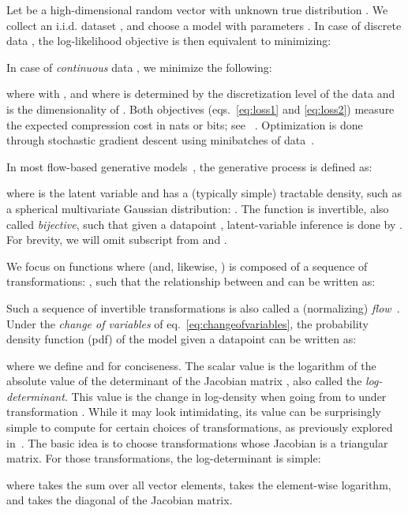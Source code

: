 \documentclass{article}
\begin{document}
Let  be a high-dimensional random vector with unknown true distribution .
We collect an i.i.d. dataset , and choose a model  with parameters . In case of discrete data , the log-likelihood objective is then equivalent to minimizing:

In case of \emph{continuous} data , we minimize the following:

where  with , and  where  is determined by the discretization level of the data and  is the dimensionality of . Both objectives (eqs.~\eqref{eq:loss1} and \eqref{eq:loss2}) measure the expected compression cost in nats or bits; see ~\citep{dinh2016density}. Optimization is done through stochastic gradient descent using minibatches of data~\citep{kingma2015adam}.

In most flow-based generative models~\citep{dinh2014nice,dinh2016density}, the generative process is defined as:

where  is the latent variable and  has a (typically simple) tractable density, such as a spherical multivariate Gaussian distribution: . The function  is invertible, also called \emph{bijective}, such that given a datapoint , latent-variable inference is done by . For brevity, we will omit subscript  from  and .

We focus on functions where  (and, likewise, ) is composed of a sequence of transformations: , such that the relationship between  and  can be written as:

Such a sequence of invertible transformations is also called a (normalizing) \emph{flow}~\citep{rezende2015variational}. Under the \emph{change of variables} of eq.~\eqref{eq:changeofvariables}, the probability density function (pdf) of the model given a datapoint can be written as:

where we define  and  for conciseness.
The scalar value  is the logarithm of the absolute value of the determinant of the Jacobian matrix , also called the \emph{log-determinant}. This value is the change in log-density when going from  to  under transformation . While it may look intimidating, its value can be surprisingly simple to compute for certain choices of transformations, as previously explored in~\citep{deco1995higher,dinh2014nice,rezende2015variational,kingma2016improving}. The basic idea is to choose transformations whose Jacobian  is a triangular matrix. For those transformations, the log-determinant is simple:

where  takes the sum over all vector elements,  takes the element-wise logarithm, and  takes the diagonal of the Jacobian matrix.
\end{document}
